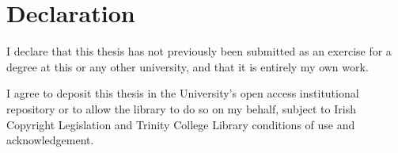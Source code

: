   \chapter*{Declaration}
  I declare that this thesis has not previously been submitted as an exercise for a degree at this or any other university, and that it is entirely my own work.

  I agree to deposit this thesis in the University's open access institutional repository or to allow the library to do so on my behalf, subject to Irish Copyright Legislation and Trinity College Library conditions of use and acknowledgement.


  \noindent\parbox{\textwidth}{
  \vspace{2cm}
  \centering
    }
  \clearpage
